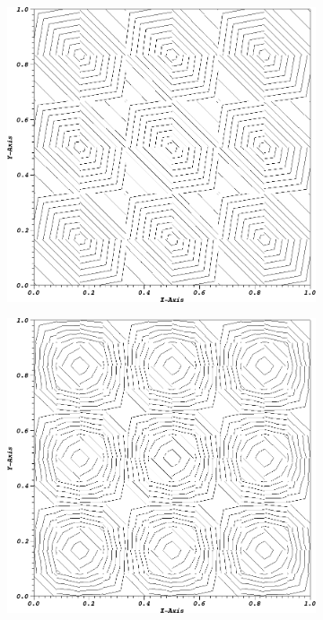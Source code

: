 \begin{figure}
{\begin{subfigure}[b]{0.45\textwidth}
	\end{subfigure}
}
\vspace{2.5mm}
{
	\begin{subfigure}[b]{0.45\textwidth}
		\centering
		\label{subfig::SineMMS_Tri00_PWL1}
		\includegraphics[width=\textwidth]{figures/sec_BF/MMSSine_PWL1_Tri_cyc00.png}
	\end{subfigure}
	\hfill
	\begin{subfigure}[b]{0.45\textwidth}
		\centering
		\label{subfig::SineMMS_Tri01_PWL1}
		\includegraphics[width=\textwidth]{figures/sec_BF/MMSSine_PWL1_Tri_cyc01.png}

\end{subfigure}}
\end{figure}

